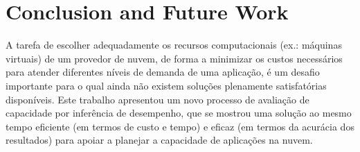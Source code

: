 \documentclass[10pt,conference,compsocconf]{IEEEtran}
\begin{document}
%



\section{Conclusion and Future Work}\label{sec:conclusion}

A tarefa de escolher adequadamente os recursos computacionais (ex.: máquinas
virtuais) de um provedor de nuvem, de forma a minimizar os custos necessários para atender diferentes níveis de demanda de uma aplicação, é um desafio importante para o qual ainda não existem soluções plenamente satisfatórias disponíveis. Este trabalho apresentou um novo processo de avaliação de capacidade por inferência de desempenho, que se mostrou uma solução ao mesmo tempo eficiente (em termos de custo e tempo) e eficaz (em termos da acurácia dos resultados) para apoiar a planejar a capacidade de aplicações na nuvem. 

\end{document}
